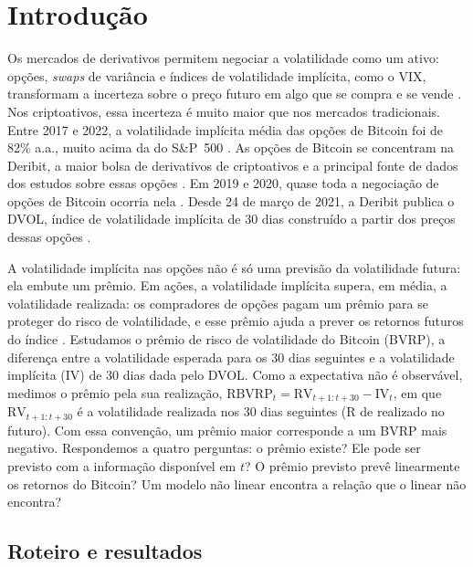 \chapter{Introdução}
\label{chap:introducao}

Os mercados de derivativos permitem negociar a volatilidade como um ativo:
opções, \textit{swaps} de variância e índices de volatilidade implícita, como o
VIX, transformam a incerteza sobre o preço futuro em algo que se compra e se
vende \citep{carr2009variance, alexanderImeraj2019}. Nos criptoativos, essa
incerteza é muito maior que nos mercados tradicionais. Entre 2017 e 2022, a
volatilidade implícita média das opções de Bitcoin foi de 82\% a.a., muito
acima da do S\&P~500 \citep{almeida2024cryptoVRP}. As
opções de Bitcoin se concentram na Deribit, a maior bolsa de derivativos de
criptoativos e a principal fonte de dados dos estudos sobre essas opções
\citep{almeida2024cryptoVRP}. Em 2019 e 2020, quase toda a negociação de opções
de Bitcoin ocorria nela \citep{alexanderImeraj2019}. Desde 24 de março de 2021,
a Deribit publica o DVOL, índice de volatilidade implícita de 30 dias
construído a partir dos preços dessas opções \citep{han2026price}.

A volatilidade implícita nas opções não é só uma previsão da volatilidade
futura: ela embute um prêmio. Em ações, a volatilidade implícita supera, em
média, a volatilidade realizada: os compradores de opções pagam um prêmio para
se proteger do risco de volatilidade, e esse prêmio ajuda a prever os retornos
futuros do índice \citep{bollerslev2009expected}. Estudamos o
prêmio de risco de volatilidade do Bitcoin (BVRP), a diferença entre a
volatilidade esperada para os 30 dias seguintes e a volatilidade implícita (IV)
de 30 dias dada pelo DVOL. Como a expectativa não é observável,
medimos o prêmio pela sua realização,
$\text{RBVRP}_t = \text{RV}_{t+1:t+30} - \text{IV}_t$, em que
$\text{RV}_{t+1:t+30}$ é a volatilidade realizada nos 30 dias seguintes (R de
realizado no futuro). Com essa convenção, um prêmio maior corresponde a um
BVRP mais negativo. Respondemos a quatro perguntas: o prêmio existe? Ele pode ser previsto com a informação
disponível em $t$? O prêmio previsto prevê linearmente os retornos do Bitcoin?
Um modelo não linear encontra a relação que o linear não encontra?

\section*{Roteiro e resultados}
\label{sec:intro-roteiro}

